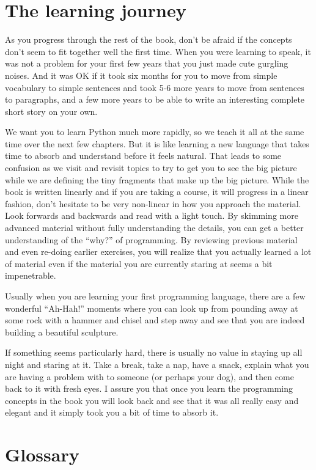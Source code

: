 \section{The learning journey}

As you progress through the rest of the book, don't be afraid if the concepts 
don't seem to fit together well the first time.  When you were learning to speak, 
it was not a problem  for your first few years that you just made cute gurgling noises.
And it was OK if it took six months for you to move from simple vocabulary to 
simple sentences and took 5-6 more years to move from sentences to paragraphs, and a
few more years to be able to write an interesting complete short story on your own.

We want you to learn Python much more rapidly, so we teach it all at the same time
over the next few chapters.  
But it is like learning a new language that takes time to absorb and understand
before it feels natural.
That leads to some confusion as we visit and revisit
topics to try to get you to see the big picture while we are defining the tiny
fragments that make up the big picture.  While the book is written linearly and
if you are taking a course, it will progress in a linear fashion, don't hesitate
to be very non-linear in how you approach the material.  Look forwards and backwards
and read with a light touch.  By skimming more advanced material without 
fully understanding the details, you can get a better understanding of the ``why?'' 
of programming.  By reviewing previous material and even re-doing earlier 
exercises, you will realize that you actually learned a lot of material even 
if the material you are currently staring at seems a bit impenetrable.

Usually when you are learning your first programming language, there are a few
wonderful ``Ah-Hah!'' moments where you can look up from pounding away at some rock
with a hammer and chisel and step away and see that you are indeed building 
a beautiful sculpture.

If something seems particularly hard, there is usually no value in staying up all 
night and staring at it.   Take a break, take a nap, have a snack, explain what you 
are having a problem with to someone (or perhaps your dog), and then come back to it with
fresh eyes.  I assure you that once you learn the programming concepts in the book
you will look back and see that it was all really easy and elegant and it simply 
took you a bit of time to absorb it.

\section{Glossary}

